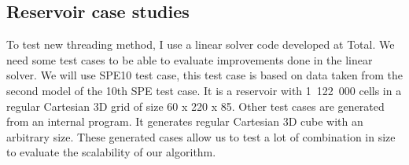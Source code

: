 \subsection{Reservoir case studies}
To test new threading method, I use a linear solver code developed at Total.
%
We need some test cases to be able to evaluate improvements done in the linear solver.
%
We will use SPE10 test case, this test case is based on data taken from the second model of the 10th SPE test case\cite{SPE10}.
%
It is a reservoir with 1~122~000 cells in a regular Cartesian 3D grid of size 60 x 220 x 85.
%
Other test cases are generated from an internal program.
%
It generates regular Cartesian 3D cube with an arbitrary size.
%
These generated cases allow us to test a lot of combination in size to evaluate the scalability of our algorithm.
